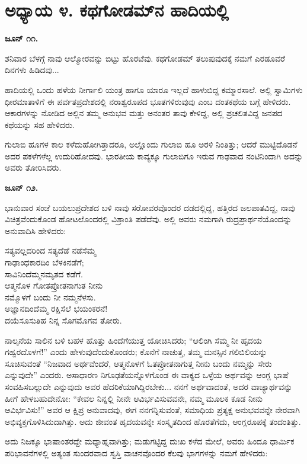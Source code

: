 
\chapter{ಅಧ್ಯಾಯ ೪. ಕಥಗೋಡಮ್​ನ ಹಾದಿಯಲ್ಲಿ}

\textbf{ಜೂನ್ ೧೧.}

ಶನಿವಾರ ಬೆಳಗ್ಗೆ ನಾವು ಆಲ್ಮೋರವನ್ನು ಬಿಟ್ಟು ಹೊರಟೆವು. ಕಥಗೋಡಮ್​ ತಲುಪುವುದಕ್ಕೆ ನಮಗೆ ಎರಡೂವರೆ ದಿನಗಳು ಹಿಡಿದವು...

ಹಾದಿಯಲ್ಲಿ ಒಂದು ಹಳೆಯ ನೀರ್ಗಾಲಿ ಯಂತ್ರ ಹಾಗೂ ಯಾರೂ ಇಲ್ಲದೆ ಹಾಳುಬಿದ್ದ ಕಮ್ಮಾರಸಾಲೆ. ಅಲ್ಲಿ ಸ್ವಾಮಿಗಳು ಧೀರಮಾತಾಳಿಗೆ ಈ ಪರ್ವತಪ್ರದೇಶದಲ್ಲಿ ನರಾಶ್ವರೂಪದ ಭೂತಗಳಿರುವುವು ಎಂಬ ದಂತಕಥೆಯ ಬಗ್ಗೆ ಹೇಳಿದರು. ಆಕಾರಗಳನ್ನು ನೋಡಿದ ಅಲ್ಲಿನ ತಮ್ಮ ಅನುಭವ ಮತ್ತು ಅನಂತರ ತಾವು ಕೇಳಿದ್ದ, ಅಲ್ಲಿ ಪ್ರಚಲಿತವಿದ್ದ ಜನಪದ ಕಥೆಯನ್ನು ಸಹ ಹೇಳಿದರು.

ಗುಲಾಬಿ ಹೂಗಳ ಕಾಲ ಕಳೆದುಹೋಗಿತ್ತಾದರೂ, ಅಲ್ಲೊಂದು ಗುಲಾಬಿ ಹೂ ಅರಳಿ ನಿಂತಿತ್ತು; ಆದರೆ ಮುಟ್ಟಿದೊಡನೆ ಅದರ ಪಕಳೆಗಳೆಲ್ಲ ಉದುರಿಹೋದವು. ಭಾರತೀಯ ಕಾವ್ಯಕ್ಕೂ ಗುಲಾಬಿಗೂ ಇರುವ ಗಾಢವಾದ ನಂಟಿನಿಂದಾಗಿ ಅದನ್ನು ಅವರು ತೋರಿಸಿದರು.

\textbf{ಜೂನ್ ೧೨.}

ಭಾನುವಾರ ಸಂಜೆ ಬಯಲುಪ್ರದೇಶದ ಬಳಿ ನಾವು ಸರೋವರವೊಂದರ ದಡದಲ್ಲಿದ್ದ, ಹತ್ತಿರದ ಜಲಪಾತವಿದ್ದ, ನಾವು ವಿಚಿತ್ರವೆಂದುಕೊಂಡ ಹೋಟಲೊಂದರಲ್ಲಿ ವಿಶ್ರಾಂತಿ ಪಡೆದೆವು. ಅಲ್ಲಿ ಅವರು ನಮಗಾಗಿ ರುದ್ರಪ್ರಾರ್ಥನೆಯೊಂದನ್ನು ಅನುವಾದಿಸಿ ಹೇಳಿದರು:

\begin{myquote}
ಸತ್ಯವಲ್ಲದರಿಂದ ಸತ್ಯದೆಡೆ ನಡೆಸೆಮ್ಮ\\ಗಾಢಾಂಧಕಾರದಿಂ ಬೆಳಕಿನಡೆಗೆ;\\ಸಾವಿನಿಂದೆಮ್ಮನಮೃತದ ಕಡೆಗೆ.\\ಆತ್ಮನೊಳ ಗೋತಪ್ರೋತನಾಗುತ ನೀನು\\ನಮ್ಮೊಳಗೆ ಬಂದು ನೀ ನಮ್ಮನೆಳಸು.\\ಅಜ್ಞಾನದಿಂದೆಮ್ಮ ರಕ್ಷಿಸೆಲೆ ಭಯಂಕರನೆ!\\ದಯೆಸೂಸುತಿಹ ನಿನ್ನ ಸೊಗಮೊಗವ ತೋರು.
\end{myquote}

ನಾಲ್ಕನೆಯ ಸಾಲಿನ ಬಳಿ ಬಹಳ ಹೊತ್ತು ಹಿಂದೆಗೆಯುತ್ತ ಯೋಚಿಸಿದರು; “ಆಲಿಂಗಿ ಸೆಮ್ಮ ನೀ ಹೃದಯ ಗಹ್ವರದೊಳಗೆ!” ಎಂದು ಹೇಳುವುದೆಂದುಕೊಂಡರು; ಕೊನೆಗೆ ನಾಚುತ್ತ, ತಮ್ಮ ಮನಸ್ಸಿನ ಗಲಿಬಿಲಿಯನ್ನು ಸೂಚಿಸುವಂತೆ “ನಿಜವಾದ ಅರ್ಥವೆಂದರೆ, ಆತ್ಮನೊಳಗೆ ಓತಪ್ರೋತನಾಗುತ್ತ ನೀನು ಬಂದು ನಮ್ಮನ್ನು ಸೇರು ಎನ್ನುವುದೇ” ಎಂದರು. ಅಸಾಧಾರಣ ನಿಗೂಢತೆಯನ್ನೊಳಗೊಂಡ ಈ ವಾಕ್ಯದ ಒಳ್ಳೆಯ ಅರ್ಥವನ್ನು ಆಂಗ್ಲ ಭಾಷೆ ಸಂವಹಿಸಬಲ್ಲುದೇ ಎನ್ನುವುದು ಅವರ ಹೆದರಿಕೆಯಾಗಿದ್ದಿರಬೇಕು... ನನಗೆ ಅರ್ಥವಾದಂತೆ, ಅದರ ವಾಚ್ಯಾರ್ಥವನ್ನು ಹೀಗೆ ಹೇಳಬಹುದೇನೋ: “ಕೇವಲ ನಿನ್ನಲ್ಲಿ ನೀನೇ ಆವಿರ್ಭವಿಸುವವನೇ, ನಮ್ಮ ಮೂಲಕ ಕೂಡ ನೀನು ಆವಿರ್ಭವಿಸು!” ಅವರ ಆ ಕ್ಷಿಪ್ರ ಅನುವಾದವು, ಈಗ ನನಗನ್ನಿಸುವಂತೆ, ಸಮಾಧಿಯ ಪ್ರತ್ಯಕ್ಷ ಅನುಭವವನ್ನೇ ನೇರವಾಗಿ ಅಭಿವ್ಯಕ್ತಗೊಳಿಸಿದುದಾಗಿತ್ತು. ಅದು ಜೀವಂತ ಹೃದಯವನ್ನೇ ಸಂಸ್ಕೃತದಿಂದ ಹೊರತೆಗೆದು, ಆಂಗ್ಲರೂಪಕ್ಕೆ ತಂದಂತಿತ್ತು.

ಅದು ನಿಜಕ್ಕೂ ಭಾಷಾಂತರದ್ದೇ ಮಧ್ಯಾಹ್ನವಾಗಿತ್ತು; ಮಡುಗಟ್ಟಿದ್ದ ದುಃಖ ಕಳೆದ ಮೇಲೆ, ಅವರು ಹಿಂದೂ ಧಾರ್ಮಿಕ ಪರಿಭಾವನೆಗಳಲ್ಲಿ ಅತ್ಯಂತ ಸುಂದರವಾದ ಸ್ವಸ್ತಿ ವಾಚನವೊಂದರ ಕೆಲವು ಭಾಗಗಳನ್ನು ನಮಗೆ ಹೇಳಿದರು:

